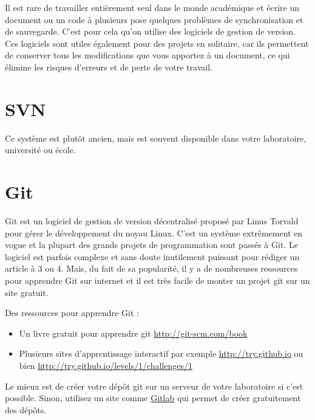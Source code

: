 Il est rare de travailler entièrement seul dans le monde académique et écrire un document ou un code à plusieurs 
pose quelques problèmes de synchronisation et de sauvegarde. C'est pour cela qu'on utilise des logiciels de gestion de version.
Ces logiciels sont utiles également pour des projets en solitaire, car ils permettent de conserver tous les modifications
que vous apportez à un document, ce qui élimine les risques d'erreurs et de perte de votre travail. 


\section{SVN}
Ce syst\`eme est plutôt ancien, mais est souvent  disponible dans votre laboratoire, université ou école.

\section{Git}

Git est un logiciel de gestion de version décentralisé proposé par Linus Torvald pour
gérer le développement du noyau Linux. C'est un système extrêmement en vogue et la plupart des
 grands projets de programmation sont passés à Git. Le logiciel est parfois complexe et sans doute
 inutilement puissant pour rédiger un article à 3 ou 4. Mais, du fait de sa popularité, il y a de nombreuses
 ressources pour apprendre Git sur internet et il est très facile de monter un projet git sur un site gratuit.
 
 
 Des ressources pour apprendre Git :
 \begin{itemize}
  \item Un livre gratuit pour apprendre git \url{http://git-scm.com/book}
  \item Plusieurs sites d'apprentissage interactif par exemple  \url{http://try.github.io}
ou bien \url{http://try.github.io/levels/1/challenges/1}
 \end{itemize}

 
 Le mieux est de créer votre dépôt git sur un serveur de votre laboratoire si c'est possible.
 Sinon, utilisez un site comme \href{http://gitlab.org/}{Gitlab} qui permet de créer gratuitement des dépôts.